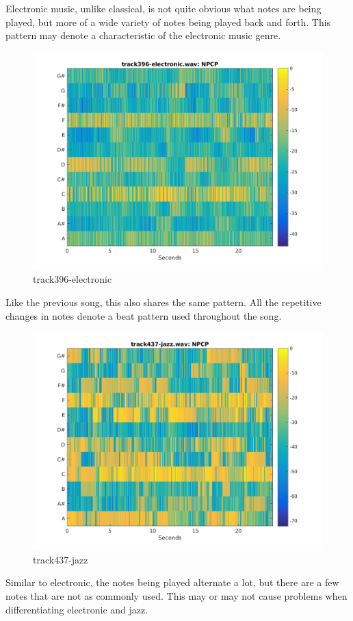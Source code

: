 \documentclass[11pt, a4paper]{article}
\begin{document}
Electronic music, unlike classical, is not quite obvious what notes are being played, but more of a wide variety of notes being played back and forth. This pattern may denote a characteristic of the electronic music genre.

\begin{figure}[H]
    \centering
    \includegraphics[width=.8\textwidth]{track396-electronic-NPCP.png}
    \caption{track396-electronic}
\end{figure}


Like the previous song, this also shares the same pattern. All the repetitive changes in notes denote a beat pattern used throughout the song. 


\begin{figure}[H]
    \centering
    \includegraphics[width=.8\textwidth]{track437-jazz-NPCP.png}
    \caption{track437-jazz}
\end{figure}



Similar to electronic, the notes being played alternate a lot, but there are a few notes that are not as commonly used. This may or may not cause problems when differentiating electronic and jazz.
\end{document}
